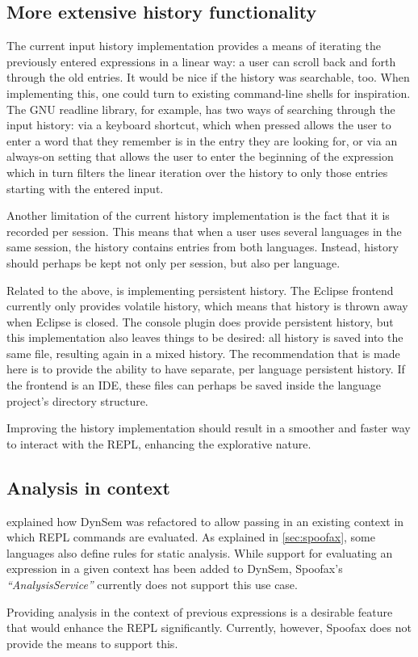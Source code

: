 \subsection{More extensive history functionality}

The current input history implementation provides a means of iterating the
previously entered expressions in a linear way: a user can scroll back and forth
through the old entries. It would be nice if the history was searchable, too.
When implementing this, one could turn to existing command-line shells for
inspiration. The GNU readline library, for example, has two ways of searching
through the input history: via a keyboard shortcut, which when pressed allows
the user to enter a word that they remember is in the entry they are looking
for, or via an always-on setting that allows the user to enter the beginning of
the expression which in turn filters the linear iteration over the
history to only those entries starting with the entered input.

Another limitation of the current history implementation is the fact that it is
recorded per session. This means that when a user uses several languages in the
same session, the history contains entries from both languages. Instead,
history should perhaps be kept not only per session, but also per language.

Related to the above, is implementing persistent history. The Eclipse frontend
currently only provides volatile history, which means that history is thrown
away when Eclipse is closed. The console plugin does provide persistent history,
but this implementation also leaves things to be desired: all history is saved
into the same file, resulting again in a mixed history. The recommendation that
is made here is to provide the ability to have separate, per language
persistent history. If the frontend is an IDE, these files can perhaps be saved
inside the language project's directory structure.

Improving the history implementation should result in a smoother and
faster way to interact with the REPL, enhancing the explorative nature.

\subsection{Analysis in context}

 explained how DynSem was refactored to allow passing
in an existing context in which REPL commands are evaluated. As explained
in \cref{sec:spoofax}, some languages also define rules for static analysis.
While support for evaluating an expression in a given context has been added to
DynSem, Spoofax's \textit{``AnalysisService''} currently does not support this
use case.

Providing analysis in the context of previous expressions is a desirable
feature that would enhance the REPL significantly. Currently, however,
Spoofax does not provide the means to support this.

